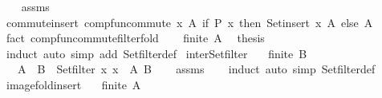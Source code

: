 \begin{isabellebody}
%
\isadelimproof
\ \ %
\endisadelimproof
%
\isatagproof
{}\isamarkupfalse%
\ assms\isanewline
{}\isamarkupfalse%
\ {\isacharminus}{\kern0pt}\isanewline
\ \ \isamarkupfalse%
\ commute{\isacharunderscore}{\kern0pt}insert{\isacharcolon}{\kern0pt}\ comp{\isacharunderscore}{\kern0pt}fun{\isacharunderscore}{\kern0pt}commute\ {\isachardoublequoteopen}{\isacharparenleft}{\kern0pt}{\isasymlambda}x\ A{\isacharprime}{\kern0pt}{\isachardot}{\kern0pt}\ if\ P\ x\ then\ Set{\isachardot}{\kern0pt}insert\ x\ A{\isacharprime}{\kern0pt}\ else\ A{\isacharprime}{\kern0pt}{\isacharparenright}{\kern0pt}{\isachardoublequoteclose}\isanewline
\ \ \ \ \isamarkupfalse%
\ {\isacharparenleft}{\kern0pt}fact\ comp{\isacharunderscore}{\kern0pt}fun{\isacharunderscore}{\kern0pt}commute{\isacharunderscore}{\kern0pt}filter{\isacharunderscore}{\kern0pt}fold{\isacharparenright}{\kern0pt}\isanewline
\ \ \isamarkupfalse%
\ {\isacartoucheopen}finite\ A{\isacartoucheclose}\ \isamarkupfalse%
\ {\isacharquery}{\kern0pt}thesis\isanewline
\ \ \ \ \isamarkupfalse%
\ induct\ {\isacharparenleft}{\kern0pt}auto\ simp\ add{\isacharcolon}{\kern0pt}\ Set{\isachardot}{\kern0pt}filter{\isacharunderscore}{\kern0pt}def{\isacharparenright}{\kern0pt}\isanewline
{}\isamarkupfalse%
%
\endisatagproof
{\isafoldproof}%
%
\isadelimproof
\isanewline
%
\endisadelimproof
\isanewline
{}\isamarkupfalse%
\ inter{\isacharunderscore}{\kern0pt}Set{\isacharunderscore}{\kern0pt}filter{\isacharcolon}{\kern0pt}\isanewline
\ \ \ {\isachardoublequoteopen}finite\ B{\isachardoublequoteclose}\isanewline
\ \ \ {\isachardoublequoteopen}A\ {\isasyminter}\ B\ {\isacharequal}{\kern0pt}\ Set{\isachardot}{\kern0pt}filter\ {\isacharparenleft}{\kern0pt}{\isasymlambda}x{\isachardot}{\kern0pt}\ x\ {\isasymin}\ A{\isacharparenright}{\kern0pt}\ B{\isachardoublequoteclose}\isanewline
%
\isadelimproof
\ \ %
\endisadelimproof
%
\isatagproof
{}\isamarkupfalse%
\ assms\isanewline
\ \ \isamarkupfalse%
\ induct\ {\isacharparenleft}{\kern0pt}auto\ simp{\isacharcolon}{\kern0pt}\ Set{\isachardot}{\kern0pt}filter{\isacharunderscore}{\kern0pt}def{\isacharparenright}{\kern0pt}%
\endisatagproof
{\isafoldproof}%
%
\isadelimproof
\isanewline
%
\endisadelimproof
\isanewline
{}\isamarkupfalse%
\ image{\isacharunderscore}{\kern0pt}fold{\isacharunderscore}{\kern0pt}insert{\isacharcolon}{\kern0pt}\isanewline
\ \ \ {\isachardoublequoteopen}finite\ A{\isachardoublequoteclose}\isanewline

\end{isabellebody}
